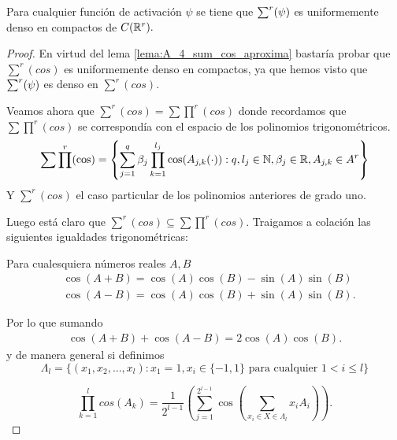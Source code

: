 \begin{lema}
    Para cualquier función de activación $\psi$ se tiene que 
    $\sum^r (\psi)$ es uniformemente denso en compactos de $C(\mathbb{R}^r).$
\end{lema}
\begin{proof}
    En virtud del lema \ref{lema:A_4_sum_cos_aproxima} 
    bastaría probar que $\sum^r(cos)$ es uniformemente 
    denso en compactos, ya que hemos visto que $\sum^r (\psi)$ 
    es denso en $\sum^r(cos)$. 

    Veamos ahora que $\sum^r(cos) = \sum \prod^r(cos)$ 
    donde recordamos que $\sum \prod^r(cos)$ se correspondía
    con el espacio de los polinomios trigonométricos. 
    \begin{equation}
        \sum \prod^r(\cos) = 
        \left\{
            \sum_{j=1}^q \beta_j 
            \prod_{k=1}^{l_j} \cos(A_{j,k}(\cdot)) 
            : q, l_j \in \mathbb{N}, \beta_j \in \mathbb{R}, A_{j,k}\in A^r
        \right\}
    \end{equation}
    Y  $\sum^r(cos)$ el caso particular de los polinomios anteriores 
    de grado uno. 
    
    Luego está claro que $\sum^r(cos) \subseteq \sum \prod^r(cos).$
    Traigamos a colación las siguientes igualdades trigonométricas:

    Para cualesquiera números reales $A,B$ 
    \begin{equation}
        \begin{split}
            &\cos(A + B)  = 
            \cos(A)\cos(B) - \sin(A)\sin(B) \\
            &\cos(A - B)  = 
            \cos(A)\cos(B) + \sin(A)\sin(B).
        \end{split}
    \end{equation}

    Por lo que sumando
    \begin{equation}
        \begin{split}
            \cos(A + B)  + \cos(A - B)
            = 2\cos(A)\cos(B).
        \end{split} 
    \end{equation}  
    y de manera general si definimos 
    \begin{equation}
        \Lambda_l = \{
            (x_1, x_2, ..., x_l) : 
            x_1 = 1, x_i \in \{-1, 1\} 
            \text{ para cualquier } 1 < i \leq l
        \}
    \end{equation}

    \begin{equation}
        \prod^l_{k=1} cos(A_k) = 
        \frac{1}{2^{l-1}}(\sum_{j=1}^{2^{l-1}} \cos(\sum_{x_i \in X \in \Lambda_l} x_i A_i)). 
    \end{equation}


\end{proof}
